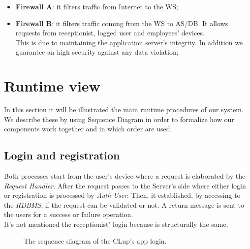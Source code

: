 \begin{itemize}
\item \textbf{Firewall A}: it filters traffic from Internet to the WS;
\item \textbf{Firewall B}: it filters traffic coming from the WS to AS/DB. It allows requests from receptionist, logged user and employees' devices.\\
This is due to maintaining the application server's integrity. In addition we guarantee an high security against any data violation;
\end{itemize}

\bigskip

\section{Runtime view}
In this section it will be illustrated the main runtime procedures of our system. We describe these by using Sequence Diagram in order to formalize how our components work together and in which order are used.

\pagebreak


\subsection{Login and registration}

Both processes start from the user's device where a request is elaborated by the \textit{Request Handler}. After the request passes to the Server's side where either login or registration is processed by \textit{Auth User}. Then, it established, by accessing to the \textit{RDBMS}, if the request can be validated or not. A return message is sent to the users for a success or failure operation. \\
It's not mentioned the receptionist' login because is structurally the same.



\begin{figure}[H]
  \label{LoginSD}
  \centering
    \caption{The sequence diagram of the CLup's app login.}
\end{figure} 


